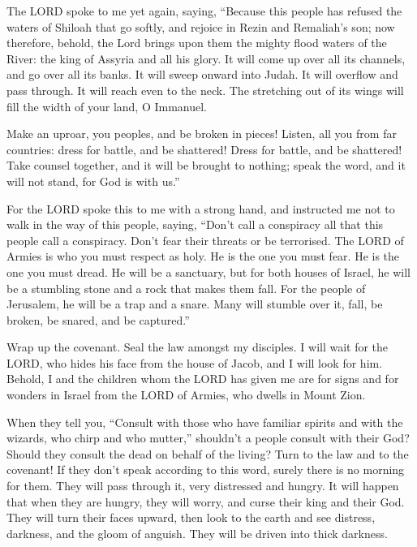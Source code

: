  The LORD spoke to me yet again, saying, 
``Because this people has refused the waters of Shiloah that go softly,
and rejoice in Rezin and Remaliah's son;  now therefore,
behold, the Lord brings upon them the mighty flood waters of the River:
the king of Assyria and all his glory. It will come up over all its
channels, and go over all its banks.  It will sweep onward
into Judah. It will overflow and pass through. It will reach even to the
neck. The stretching out of its wings will fill the width of your land,
O Immanuel.

 Make an uproar, you peoples, and be broken in pieces!
Listen, all you from far countries: dress for battle, and be shattered!
Dress for battle, and be shattered!  Take counsel
together, and it will be brought to nothing; speak the word, and it will
not stand, for God is with us.''

 For the LORD spoke this to me with a strong hand, and
instructed me not to walk in the way of this people, saying,
 ``Don't call a conspiracy all that this people call a
conspiracy. Don't fear their threats or be terrorised. 
The LORD of Armies is who you must respect as holy. He is the one you
must fear. He is the one you must dread.  He will be a
sanctuary, but for both houses of Israel, he will be a stumbling stone
and a rock that makes them fall. For the people of Jerusalem, he will be
a trap and a snare.  Many will stumble over it, fall, be
broken, be snared, and be captured.''

 Wrap up the covenant. Seal the law amongst my disciples.
 I will wait for the LORD, who hides his face from the
house of Jacob, and I will look for him.  Behold, I and
the children whom the LORD has given me are for signs and for wonders in
Israel from the LORD of Armies, who dwells in Mount Zion.

 When they tell you, ``Consult with those who have
familiar spirits and with the wizards, who chirp and who mutter,''
shouldn't a people consult with their God? Should they consult the dead
on behalf of the living?  Turn to the law and to the
covenant! If they don't speak according to this word, surely there is no
morning for them.  They will pass through it, very
distressed and hungry. It will happen that when they are hungry, they
will worry, and curse their king and their God. They will turn their
faces upward,  then look to the earth and see distress,
darkness, and the gloom of anguish. They will be driven into thick
darkness.

